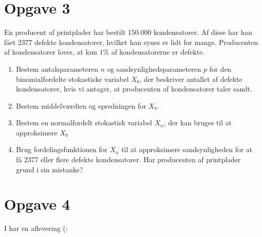 \section*{Opgave 3}

En producent af printplader har bestilt 150.000 kondensatorer. Af disse har han fået 2377 defekte kondensatorer, hvilket han synes er lidt for mange. Producenten af kondensatorer lover, at kun $1\%$ af kondensatorerne er defekte. 
\begin{enumerate}[label=\roman*)]
	\item Bestem antalsparameteren $n$ og sandsynlighedsparameteren $p$ for den binomialfordelte stokastiske variabel $X_b$, der beskriver antallet af defekte kondensatorer, hvis 
	vi antager, at producenten af kondensatorer taler sandt. 
	\item Bestem middelværdien og spredningen for $X_b$.
	\item Bestem en normalfordelt stokastisk variabel $X_n$, der kan bruges til at approksimere $X_b$
	\item Brug fordelingsfunktionen for $X_n$ til at approksimere sandsynligheden for at få 2377 eller flere defekte kondensatorer. Har producenten af printplader grund i sin mistanke?
\end{enumerate}

\section*{Opgave 4}
I har en aflevering (: